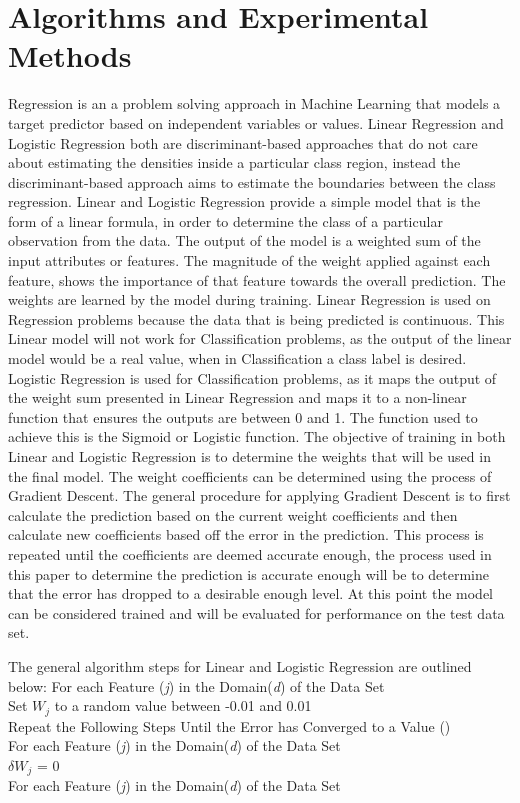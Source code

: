 \documentclass[twoside,11pt]{article}
\newcommand\tab[1][1cm]{\hspace*{#1}}
\begin{document}
\section{Algorithms and Experimental Methods}
\hspace*{10mm} Regression is an a problem solving approach in Machine Learning that models a target predictor based on independent variables or values.  Linear Regression and Logistic Regression both are discriminant-based approaches that do not care about estimating the densities inside a particular class region, instead the discriminant-based approach aims to estimate the boundaries between the class regression. Linear and Logistic Regression provide a simple model that is the form of a linear formula, in order to determine the class of a particular observation from the data. The output of the model is a weighted sum of the input attributes or features. The magnitude of the weight applied against each feature, shows the importance of that feature towards the overall prediction. The weights are learned by the model during training. Linear Regression is used on Regression problems because the data that is being predicted is continuous. This Linear model will not work for Classification problems, as the output of the linear model would be a real value, when in Classification a class label is desired. Logistic Regression is used for Classification problems, as it maps the output of the weight sum presented in Linear Regression and maps it to a non-linear function that ensures the outputs are between 0 and 1. The function used to achieve this is the Sigmoid or Logistic function.\newline
\hspace*{10mm} The objective of training in both Linear and Logistic Regression is to determine the weights that will be used in the final model. The weight coefficients can be determined using the process of Gradient Descent. The general procedure for applying Gradient Descent is to first calculate the prediction based on the current weight coefficients and then calculate new coefficients based off the error in the prediction. This process is repeated until the coefficients are deemed accurate enough, the process used in this paper to determine the prediction is accurate enough will be to determine that the error has dropped to a desirable enough level. At this point the model can be considered trained and will be evaluated for performance on the test data set.

The general algorithm steps for Linear and Logistic Regression are outlined below:\newline
For each Feature (\textit{j}) in the Domain(\textit{d}) of the Data Set\\
\tab Set $W_j$ to a random value between -0.01 and 0.01\\
Repeat the Following Steps Until the Error has Converged to a Value ()\\
\tab For each Feature (\textit{j}) in the Domain(\textit{d}) of the Data Set\\
\tab \tab $\delta W_j$ = 0\\
 \tab For each Feature (\textit{j}) in the Domain(\textit{d}) of the Data Set\\
 
\end{document}
